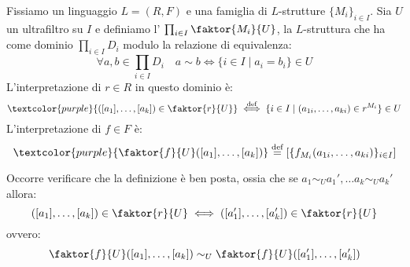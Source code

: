 \begin{definition}
    [Ultraprodotto]
    Fissiamo un linguaggio $L = (R,F)$ e una famiglia di $L$-strutture $\{M_i\}_{i \in I}$. Sia $U$ un ultrafiltro su $I$ e definiamo l' $\prod_{i \in I} \faktor{M_i}{U}$, la $L$-struttura 
    che ha come dominio $\prod_{i \in I}D_i$ modulo la relazione di equivalenza:
    \[ \forall a,b \in \prod_{i \in I}D_i \quad a \sim b \iff \{ i \in I \mid a_i = b_i \} \in U
    \]
    L'interpretazione di $r \in R$ in questo dominio è:
    \[ \textcolor{purple}{([a_1],\ldots,[a_k]) \in \faktor{r}{U}} \overset{\text{def}}{\iff} \{ i \in I \mid (a_{1i},\ldots,a_{ki}) \in r^{M_i} \} \in U
    \]
    L'interpretazione di $f \in F$ è:
    \[ \textcolor{purple}{\faktor{f}{U}([a_1],\ldots,[a_k])} \overset{\text{def}}{=} [\{f_{M_i}(a_{1i},\ldots,a_{ki})\}_{i \in I}]
    \]
\end{definition}

\begin{remark}
    Occorre verificare che la definizione è ben posta, ossia che se $a_1 \sim_U a_1',\ldots a_k \sim_U a_k'$ allora:
    \[ ([a_1],\ldots,[a_k]) \in \faktor{r}{U} \iff ([a_1'],\ldots,[a_k']) \in \faktor{r}{U}
    \]
    ovvero:
    \[ \faktor{f}{U}([a_1],\ldots,[a_k]) \sim_U \faktor{f}{U}([a_1'],\ldots,[a_k'])
    \]
\end{remark}
